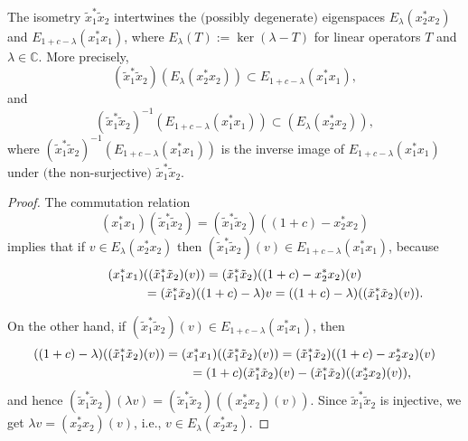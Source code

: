 \begin{proposition}\label{eigen-intertwine} The isometry $\tilde{x}_{1}^{\ast}\tilde{x}_{2}$
intertwines the $($possibly degenerate$)$ eigenspaces $E_{\lambda}(
x_{2}^{\ast}x_{2}) $ and $E_{1+c-\lambda}( x_{1}^{\ast}%
x_{1}) $, where $E_{\lambda}(T) :=\ker(\lambda-T) $ for linear operators $T$ and $\lambda\in\mathbb{C}$. More
precisely,
\[
( \tilde{x}_{1}^{\ast}\tilde{x}_{2}) ( E_{\lambda}(
x_{2}^{\ast}x_{2}) ) \subset E_{1+c-\lambda}( x_{1}^{\ast}x_{1}) ,
\]
and
\[
( \tilde{x}_{1}^{\ast}\tilde{x}_{2}) ^{-1}( E_{1+c-\lambda
}( x_{1}^{\ast}x_{1}) ) \subset( E_{\lambda}(x_{2}^{\ast}x_{2}) ),
\]
where $( \tilde{x}_{1}^{\ast}\tilde{x}_{2}) ^{-1}(
E_{1+c-\lambda}( x_{1}^{\ast}x_{1}) ) $ is the inverse
image of $E_{1+c-\lambda}( x_{1}^{\ast}x_{1}) $ under $($the
non-surjective$)$ $\tilde{x}_{1}^{\ast}\tilde{x}_{2}$.
\end{proposition}
\begin{proof} The commutation relation
\[
( x_{1}^{\ast}x_{1}) ( \tilde{x}_{1}^{\ast}\tilde{x}%
_{2}) =( \tilde{x}_{1}^{\ast}\tilde{x}_{2}) (
( 1+c) -x_{2}^{\ast}x_{2})
\]
implies that if $v\in E_{\lambda}( x_{2}^{\ast}x_{2}) $ then
$( \tilde{x}_{1}^{\ast}\tilde{x}_{2}) (v) \in
E_{1+c-\lambda}( x_{1}^{\ast}x_{1}) $, because
\begin{gather*}
( x_{1}^{\ast}x_{1}) ( ( \tilde{x}_{1}^{\ast}\tilde{x}_{2}) (v) ) =( \tilde{x}_{1}^{\ast
}\tilde{x}_{2}) ( ( 1+c) -x_{2}^{\ast}x_{2})(v)\\
\hphantom{( x_{1}^{\ast}x_{1}) ( ( \tilde{x}_{1}^{\ast}\tilde{x}_{2}) (v) )}{}
=( \tilde{x}_{1}^{\ast}\tilde{x}_{2}) ( ( 1+c)
-\lambda) v=( ( 1+c) -\lambda) (( \tilde{x}_{1}^{\ast}\tilde{x}_{2}) (v) ).
\end{gather*}

On the other hand, if $( \tilde{x}_{1}^{\ast}\tilde{x}_{2})(v) \in E_{1+c-\lambda}( x_{1}^{\ast}x_{1}) $, then
\begin{gather*}
( ( 1+c) -\lambda) ( ( \tilde{x}_{1}^{\ast}\tilde{x}_{2}) (v) ) =(
x_{1}^{\ast}x_{1}) ( ( \tilde{x}_{1}^{\ast}\tilde{x}%
_{2}) (v) ) =( \tilde{x}_{1}^{\ast}\tilde
{x}_{2}) ( ( 1+c) -x_{2}^{\ast}x_{2}) (v)\\
\hphantom{( ( 1+c) -\lambda) ( ( \tilde{x}_{1}^{\ast}\tilde{x}_{2}) (v) )}{}
=( 1+c) ( \tilde{x}_{1}^{\ast}\tilde{x}_{2}) (
v) -( \tilde{x}_{1}^{\ast}\tilde{x}_{2}) ( (
x_{2}^{\ast}x_{2}) (v) ),
\end{gather*}
and hence $( \tilde{x}_{1}^{\ast}\tilde{x}_{2}) ( \lambda
v) =( \tilde{x}_{1}^{\ast}\tilde{x}_{2}) ( (x_{2}^{\ast}x_{2}) (v) ) $. Since $\tilde{x}_{1}^{\ast}\tilde{x}_{2}$ is injective, we get $\lambda v=( x_{2}^{\ast}x_{2}) (v) $, i.e., $v\in E_{\lambda}( x_{2}^{\ast}x_{2}) $.
\end{proof}

